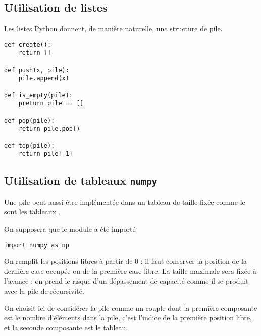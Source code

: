 \subsection{Utilisation de listes}
Les listes Python donnent, de manière naturelle, une structure de pile.
\begin{lstlisting}
def create():
    return []
    
def push(x, pile):
    pile.append(x)
    
def is_empty(pile):
    preturn pile == []
    
def pop(pile):
    return pile.pop()
    
def top(pile):
    return pile[-1]
\end{lstlisting}
\newpage
\subsection{Utilisation de tableaux {\tt numpy}}
Une pile peut aussi être implémentée dans un tableau de taille fixée comme le sont les tableaux .

On supposera que le module  a été importé
\begin{lstlisting}
import numpy as np
\end{lstlisting}

On remplit les positions libres à partir de 0 ; il faut conserver la position de la dernière case occupée ou de la première case libre. La taille maximale sera fixée à l'avance : on prend le risque d'un dépassement de capacité comme il se produit avec la pile de récursivité.

On choisit ici de considérer la pile comme un couple dont la première composante est le nombre d'éléments dans la pile, c'est l'indice de la première position libre, et la seconde composante est le tableau.


